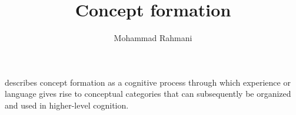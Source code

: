 \documentclass[a4paper]{article}
\title{Concept formation}
\date{}
\author{Mohammad Rahmani}
\begin{document}
   \maketitle

\cite{sloutsky-2019-categories-concepts-and-conceptual-development}
describes concept formation as a cognitive process through which experience or language gives rise to conceptual categories that can subsequently be organized and used in higher-level cognition.

   
   
\end{document}
